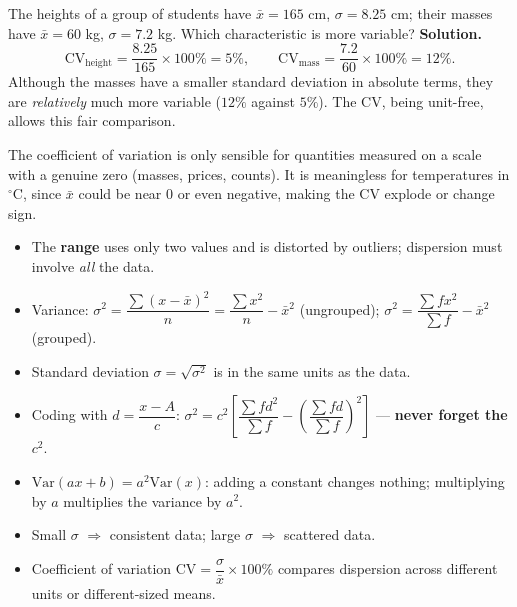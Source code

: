 \documentclass[11pt]{article}
\begin{document}
\begin{exoresolu}
The heights of a group of students have $\bar{x} = 165$ cm, $\sigma = 8.25$ cm; their masses have $\bar{x} = 60$ kg, $\sigma = 7.2$ kg. Which characteristic is more variable?
\tcblower
\textbf{Solution.}
\[ \mathrm{CV}_{\text{height}} = \frac{8.25}{165}\times 100\% = 5\%, \qquad
\mathrm{CV}_{\text{mass}} = \frac{7.2}{60}\times 100\% = 12\%. \]
Although the masses have a smaller standard deviation in absolute terms, they are \emph{relatively} much more variable ($12\%$ against $5\%$). The CV, being unit-free, allows this fair comparison.
\end{exoresolu}

\begin{attention}
The coefficient of variation is only sensible for quantities measured on a scale with a genuine zero (masses, prices, counts). It is meaningless for temperatures in ${}^\circ$C, since $\bar{x}$ could be near $0$ or even negative, making the CV explode or change sign.
\end{attention}

\begin{aretenir}
\begin{itemize}
\item The \textbf{range} uses only two values and is distorted by outliers; dispersion must involve \emph{all} the data.
\item Variance: $\sigma^2 = \dfrac{\sum (x-\bar{x})^2}{n} = \dfrac{\sum x^2}{n} - \bar{x}^2$ (ungrouped); $\sigma^2 = \dfrac{\sum fx^2}{\sum f} - \bar{x}^2$ (grouped).
\item Standard deviation $\sigma = \sqrt{\sigma^2}$ is in the same units as the data.
\item Coding with $d = \dfrac{x-A}{c}$: $\sigma^2 = c^2\left[\dfrac{\sum fd^2}{\sum f} - \left(\dfrac{\sum fd}{\sum f}\right)^2\right]$ — \textbf{never forget the $c^2$}.
\item $\mathrm{Var}(ax+b) = a^2\mathrm{Var}(x)$: adding a constant changes nothing; multiplying by $a$ multiplies the variance by $a^2$.
\item Small $\sigma$ $\Rightarrow$ consistent data; large $\sigma$ $\Rightarrow$ scattered data.
\item Coefficient of variation $\mathrm{CV} = \dfrac{\sigma}{\bar{x}}\times 100\%$ compares dispersion across different units or different-sized means.
\end{itemize}
\end{aretenir}
\end{document}
